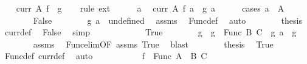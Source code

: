 \begin{isabellebody}
\ \ \isamarkupfalse%
\ {\isachardoublequoteopen}curr\ A\ {\isacharquery}{\kern0pt}f\ {\isacharequal}{\kern0pt}\ g{\isachardoublequoteclose}\isanewline
\ \ \isamarkupfalse%
\ {\isacharparenleft}{\kern0pt}rule\ ext{\isacharparenright}{\kern0pt}\isanewline
\ \ \ \ \isamarkupfalse%
\ a\ \isamarkupfalse%
\ {\isachardoublequoteopen}curr\ A\ {\isacharquery}{\kern0pt}f\ a\ {\isacharequal}{\kern0pt}\ g\ a{\isachardoublequoteclose}\isanewline
\ \ \ \ \isamarkupfalse%
\ {\isacharparenleft}{\kern0pt}cases\ {\isachardoublequoteopen}a\ {\isasymin}\ A{\isachardoublequoteclose}{\isacharparenright}{\kern0pt}\isanewline
\ \ \ \ \ \ \isamarkupfalse%
\ False\isanewline
\ \ \ \ \ \ \isamarkupfalse%
\ {\isachardoublequoteopen}g\ a\ {\isacharequal}{\kern0pt}\ undefined{\isachardoublequoteclose}\ \isamarkupfalse%
\ assms\ \isamarkupfalse%
\ Func{\isacharunderscore}{\kern0pt}def\ \isamarkupfalse%
\ auto\isanewline
\ \ \ \ \ \ \isamarkupfalse%
\ {\isacharquery}{\kern0pt}thesis\ \isamarkupfalse%
\ curr{\isacharunderscore}{\kern0pt}def\ \isamarkupfalse%
\ False\ \isamarkupfalse%
\ simp\isanewline
\ \ \ \ \isamarkupfalse%
\isanewline
\ \ \ \ \ \ \isamarkupfalse%
\ True\isanewline
\ \ \ \ \ \ \isamarkupfalse%
\ g{}\ \ {\isachardoublequoteopen}g{}\ {\isasymin}\ Func\ B\ C{\isachardoublequoteclose}\ \ {\isachardoublequoteopen}g\ a\ {\isacharequal}{\kern0pt}\ g{}{\isachardoublequoteclose}\isanewline
\ \ \ \ \ \ \isamarkupfalse%
\ assms\ \isamarkupfalse%
\ Func{\isacharunderscore}{\kern0pt}elim{\isacharbrackleft}{\kern0pt}OF\ assms\ True{\isacharbrackright}{\kern0pt}\ \isamarkupfalse%
\ blast\isanewline
\ \ \ \ \ \ \isamarkupfalse%
\ {\isacharquery}{\kern0pt}thesis\ \isamarkupfalse%
\ True\ \isamarkupfalse%
\ Func{\isacharunderscore}{\kern0pt}def\ curr{\isacharunderscore}{\kern0pt}def\ \isamarkupfalse%
\ auto\isanewline
\ \ \ \ \isamarkupfalse%
\isanewline
\ \ \isamarkupfalse%
\isanewline
\ \ \isamarkupfalse%
\ {\isachardoublequoteopen}{\isacharquery}{\kern0pt}f\ {\isasymin}\ Func\ {\isacharparenleft}{\kern0pt}A\ {\isasymtimes}\ B{\isacharparenright}{\kern0pt}\ C{\isachardoublequoteclose}\ \isamarkupfalse%

\end{isabellebody}
